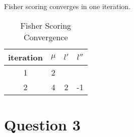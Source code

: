 \documentclass[11pt]{article}
\begin{document}
\begin{enumerate}[label=(\alph*)]
Fisher scoring converges in one iteration.

\begin{table}[h!]
\centering
\caption{Fisher Scoring Convergence}
\begin{tabular}{c | c | c | c}
iteration & $\mu$          &$ l'$                    & $l''$           \\
\hline
1         & 2  &    &            \\
2         & 4  & 2  & -1        
\end{tabular}
\end{table}
\end{enumerate}

\section*{Question 3}
\end{document}
